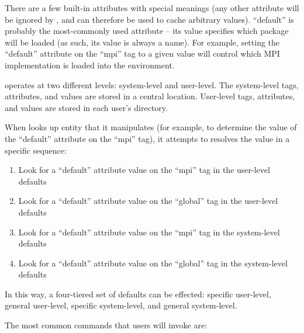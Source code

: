 There are a few built-in attributes with special meanings (any other
attribute will be ignored by , and can therefore be
used to cache arbitrary values).  ``default'' is probably the
most-commonly used attribute -- its value specifies which package will
be loaded (as such, its value is always a name).  For example, setting
the ``default'' attribute on the ``mpi'' tag to a given value will
control which MPI implementation is loaded into the environment.

 operates at two different levels: system-level and
user-level.  The system-level tags, attributes, and values are stored
in a central location.  User-level tags, attributes, and values are
stored in each user's  directory.

When  looks up entity that it manipulates (for
example, to determine the value of the ``default'' attribute on the
``mpi'' tag), it attempts to resolves the value in a specific
sequence:

\begin{enumerate}
\item Look for a ``default'' attribute value on the ``mpi'' tag in
  the user-level defaults
  
\item Look for a ``default'' attribute value on the ``global'' tag in
  the user-level defaults
  
\item Look for a ``default'' attribute value on the ``mpi'' tag in
  the system-level defaults
  
\item Look for a ``default'' attribute value on the ``global'' tag in
  the system-level defaults
\end{enumerate}

In this way, a four-tiered set of defaults can be effected: specific
user-level, general user-level, specific system-level, and general
system-level.  

The most common  commands that users will invoke
are:

